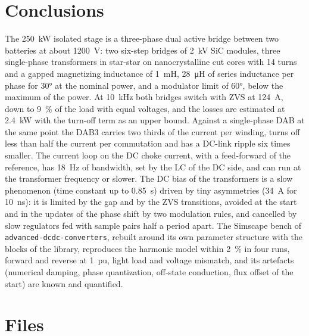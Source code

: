 \documentclass[12pt,a4paper]{scrartcl}
\newcommand{\code}[1]{\texttt{#1}}
\begin{document}
\begin{onehalfspace}
\section{Conclusions}
\label{sec:conclusions}

The \SI{250}{\kilo\watt} isolated stage is a three-phase dual active bridge between two batteries at about \SI{1200}{\volt}: two six-step bridges of \SI{2}{\kilo\volt} SiC modules, three single-phase transformers in star-star on nanocrystalline cut cores with 14 turns and a gapped magnetizing inductance of \SI{1}{\milli\henry}, \SI{28}{\micro\henry} of series inductance per phase for \ang{30} at the nominal power, and a modulator limit of \ang{60}, below the maximum of the power. At \SI{10}{\kilo\hertz} both bridges switch with ZVS at \SI{124}{\ampere}, down to \SI{9}{\percent} of the load with equal voltages, and the losses are estimated at \SI{2.4}{\kilo\watt} with the turn-off term as an upper bound. Against a single-phase DAB at the same point the DAB3 carries two thirds of the current per winding, turns off less than half the current per commutation and has a DC-link ripple six times smaller. The current loop on the DC choke current, with a feed-forward of the reference, has \SI{18}{\hertz} of bandwidth, set by the LC of the DC side, and can run at the transformer frequency or slower. The DC bias of the transformers is a slow phenomenon (time constant up to \SI{0.85}{\second}) driven by tiny asymmetries (\SI{34}{\ampere} for \SI{10}{\nano\second}): it is limited by the gap and by the ZVS transitions, avoided at the start and in the updates of the phase shift by two modulation rules, and cancelled by slow regulators fed with sample pairs half a period apart. The Simscape bench of \code{advanced-dcdc-converters}, rebuilt around its own parameter structure with the blocks of the library, reproduces the harmonic model within \SI{2}{\percent} in four runs, forward and reverse at \SI{1}{pu}, light load and voltage mismatch, and its artefacts (numerical damping, phase quantization, off-state conduction, flux offset of the start) are known and quantified.

\appendix
\section{Files}
\label{sec:files}


\end{onehalfspace}
\end{document}
